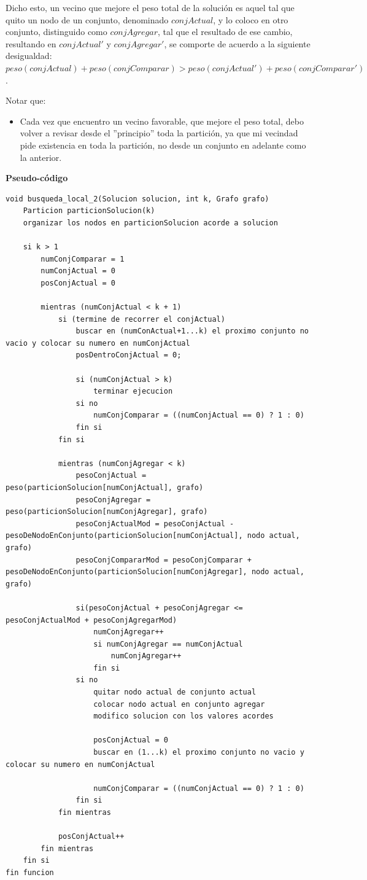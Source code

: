 \documentclass[10pt,a4paper]{article}
\begin{document}
Dicho esto, un vecino que mejore el peso total de la solución es aquel tal que quito un nodo de un conjunto, denominado $conjActual$, y lo coloco en otro conjunto, distinguido como $conjAgregar$, tal que el resultado de ese cambio, resultando en $conjActual'$ y $conjAgregar'$, se comporte de acuerdo a la siguiente desigualdad: $peso(conjActual) + peso(conjComparar) > peso(conjActual') + peso(conjComparar')$.

Notar que:

\begin{itemize}
\item Cada vez que encuentro un vecino favorable, que mejore el peso total, debo volver a revisar desde el ''principio'' toda la partición, ya que mi vecindad pide existencia en toda la partición, no desde un conjunto en adelante como la anterior.
\end{itemize}

\textbf{Pseudo-código}

\begin{lstlisting}
void busqueda_local_2(Solucion solucion, int k, Grafo grafo)
	Particion particionSolucion(k)
	organizar los nodos en particionSolucion acorde a solucion
	
	si k > 1
		numConjComparar = 1
		numConjActual = 0
		posConjActual = 0
		
		mientras (numConjActual < k + 1)
			si (termine de recorrer el conjActual)
				buscar en (numConActual+1...k) el proximo conjunto no vacio y colocar su numero en numConjActual
				posDentroConjActual = 0;				
				
				si (numConjActual > k)
					terminar ejecucion
				si no
					numConjComparar = ((numConjActual == 0) ? 1 : 0)
				fin si
			fin si
			
			mientras (numConjAgregar < k)
				pesoConjActual = peso(particionSolucion[numConjActual], grafo)
				pesoConjAgregar = peso(particionSolucion[numConjAgregar], grafo)
				pesoConjActualMod = pesoConjActual - pesoDeNodoEnConjunto(particionSolucion[numConjActual], nodo actual, grafo)
				pesoConjCompararMod = pesoConjComparar + pesoDeNodoEnConjunto(particionSolucion[numConjAgregar], nodo actual, grafo)
				
				si(pesoConjActual + pesoConjAgregar <= pesoConjActualMod + pesoConjAgregarMod)
					numConjAgregar++
					si numConjAgregar == numConjActual
						numConjAgregar++
					fin si
				si no
					quitar nodo actual de conjunto actual
					colocar nodo actual en conjunto agregar
					modifico solucion con los valores acordes
					
					posConjActual = 0
					buscar en (1...k) el proximo conjunto no vacio y colocar su numero en numConjActual
					
					numConjComparar = ((numConjActual == 0) ? 1 : 0)
				fin si
			fin mientras
			
			posConjActual++
		fin mientras
	fin si
fin funcion
\end{lstlisting}
\newpage
\end{document}
